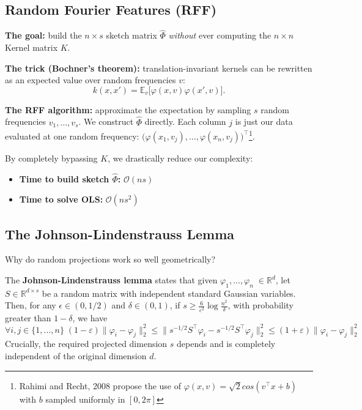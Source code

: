 \documentclass[
11pt,notheorems,hyperref={pdfauthor=whatever}
]{beamer}
\begin{document}
\subsection{Random Fourier Features (RFF)}

\begin{frame}
    \alert{\textbf{The goal:}} build the \(n \times s\) sketch matrix \(\hat{\Phi}\) \textit{without} ever computing the \(n \times n\) Kernel matrix \(K\).

    \vspace{0.5em}
    \textbf{The trick (Bochner's theorem):} 
    translation-invariant kernels can be rewritten as an expected value over random frequencies \(v\):
    \[
        k(x, x') = \mathbb{E}_v \big[ \varphi(x, v)\varphi(x', v) \big].
    \]

    \vspace{0.25em}
    \textbf{The RFF algorithm:}
    approximate the expectation by sampling \(s\) random frequencies \(v_1, \dots, v_s\). We construct \(\hat{\Phi}\) directly. Each column \(j\) is just our data evaluated at one random frequency: \(\big(\varphi(x_1, v_j), \dots, \varphi(x_n, v_j)\big)^\top\)\footnote{Rahimi and Recht, 2008 propose the use of \(\varphi(x, v) = \sqrt{2}cos(v^\top x + b)\) with $b$ sampled uniformly in $[0, 2\pi]$}.
    \vspace{0.5em}
    \begin{block}{}
        By completely bypassing \(K\), we drastically reduce our complexity:
        \begin{itemize}
            \item \textbf{Time to build sketch \(\hat{\Phi}\):} \(\mathcal{O}(ns)\)
            \item \textbf{Time to solve OLS:} \(\mathcal{O}(ns^2)\)
        \end{itemize}
    \end{block}
\end{frame}

\subsection{The Johnson-Lindenstrauss Lemma}
\begin{frame}
    Why do random projections work so well geometrically? 
    
    The \alert{\textbf{Johnson-Lindenstrauss lemma}} states that given \(\varphi_1,...,\varphi_n\;\in \mathbb{R}^d\), let \(S \in \mathbb{R}^{d \times s}\) be a random matrix with independent standard Gaussian variables. Then, for any \(\epsilon \in (0, 1/2)\) and \(\delta \in (0, 1)\), if \(s \ge \frac{6}{\varepsilon^2} \log \frac{n^2}{\delta}\), with probability greater than \(1-\delta\), we have
    \[
        \forall i,j \in \{1,...,n\}\;(1-\varepsilon)\|\varphi_i - \varphi_j\|_2^2 \le \|s^{-1/2}S^\top \varphi_i - s^{-1/2}S^\top \varphi_j\|_2^2 \le (1+\varepsilon)\|\varphi_i - \varphi_j\|_2^2
    \]
    Crucially, the required projected dimension \(s\) depends  and is completely independent of the original dimension \(d\).
\end{frame}
\end{document}
